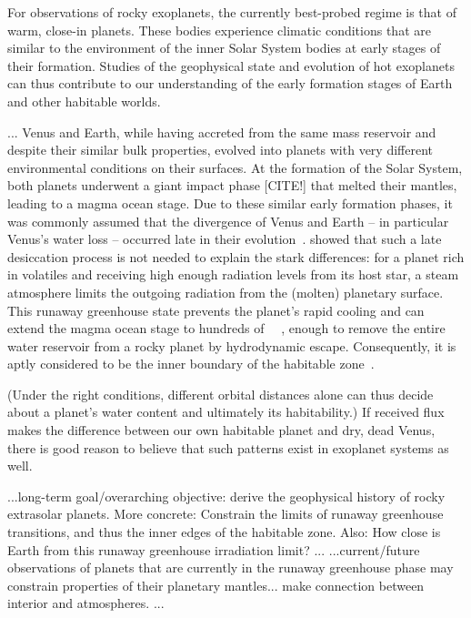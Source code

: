 \documentclass[twocolumn,twocolappendix]{aastex631}
\begin{document}
\begin{note}
For observations of rocky exoplanets, the currently best-probed regime is that of warm, close-in planets.
These bodies experience climatic conditions that are similar to the environment of the inner Solar System bodies at early stages of their formation.
Studies of the geophysical state and evolution of hot exoplanets can thus contribute to our understanding of the early formation stages of Earth and other habitable worlds.

...
    Venus and Earth, while having accreted from the same mass reservoir and despite their similar bulk properties, evolved into planets with very different environmental conditions on their surfaces.
    At the formation of the Solar System, both planets underwent a giant impact phase [CITE!] that melted their mantles, leading to a magma ocean stage.
    Due to these similar early formation phases, it was commonly assumed that the divergence of Venus and Earth -- in particular Venus's water loss -- occurred late in their evolution~\citep{Elkins-Tanton2013}.
    \citet{Hamano2013} showed that such a late desiccation process is not needed to explain the stark differences: for a planet rich in volatiles and receiving high enough radiation levels from its host star, a steam atmosphere limits the outgoing radiation from the (molten) planetary surface.
    This runaway greenhouse state prevents the planet's rapid cooling and can extend the magma ocean stage to hundreds of \SI{}{\mega\year}, enough to remove the entire water reservoir from a rocky planet by hydrodynamic escape.
    Consequently, it is aptly considered to be the inner boundary of the habitable zone~\citep{Kasting1993,Kopparapu2013}.

    (Under the right conditions, different orbital distances alone can thus decide about a planet's water content and ultimately its habitability.)
    If received flux makes the difference between our own habitable planet and dry, dead Venus, there is good reason to believe that such patterns exist in exoplanet systems as well.

    ...long-term goal/overarching objective: derive the geophysical history of rocky extrasolar planets. More concrete: Constrain the limits of runaway greenhouse transitions, and thus the inner edges of the habitable zone. Also: How close is Earth from this runaway greenhouse irradiation limit?
   ...
    ...current/future observations of planets that are currently in the runaway greenhouse phase may constrain properties of their planetary mantles... make connection between interior and atmospheres.
    ...


\end{note}
\end{document}
